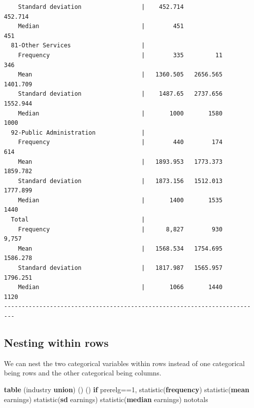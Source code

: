 \documentclass[
]{book}
\newenvironment{Shaded}{\begin{snugshade}}{\end{snugshade}}
\newcommand{\FunctionTok}[1]{\textcolor[rgb]{0.13,0.29,0.53}{\textbf{#1}}}
\newcommand{\KeywordTok}[1]{\textcolor[rgb]{0.13,0.29,0.53}{\textbf{#1}}}
\newcommand{\NormalTok}[1]{#1}
\begin{document}
\begin{verbatim}
    Standard deviation                 |    452.714               452.714
    Median                             |        451                   451
  81-Other Services                    |                                 
    Frequency                          |        335         11        346
    Mean                               |   1360.505   2656.565   1401.709
    Standard deviation                 |    1487.65   2737.656   1552.944
    Median                             |       1000       1580       1000
  92-Public Administration             |                                 
    Frequency                          |        440        174        614
    Mean                               |   1893.953   1773.373   1859.782
    Standard deviation                 |   1873.156   1512.013   1777.899
    Median                             |       1400       1535       1440
  Total                                |                                 
    Frequency                          |      8,827        930      9,757
    Mean                               |   1568.534   1754.695   1586.278
    Standard deviation                 |   1817.987   1565.957   1796.251
    Median                             |       1066       1440       1120
-------------------------------------------------------------------------
\end{verbatim}

\subsection{Nesting within rows}\label{nesting-within-rows}

We can nest the two categorical variables within rows instead of one categorical being rows and the other categorical being columns.

\begin{Shaded}
\begin{Highlighting}[]
\KeywordTok{table}\NormalTok{ (industry }\KeywordTok{union}\NormalTok{) () () }\KeywordTok{if}\NormalTok{ prerelg==1, statistic(}\KeywordTok{frequency}\NormalTok{) statistic(}\KeywordTok{mean}\NormalTok{ earnings) statistic(}\FunctionTok{sd}\NormalTok{ earnings) statistic(}\KeywordTok{median}\NormalTok{ earnings) nototals}
\end{Highlighting}
\end{Shaded}
\end{document}
